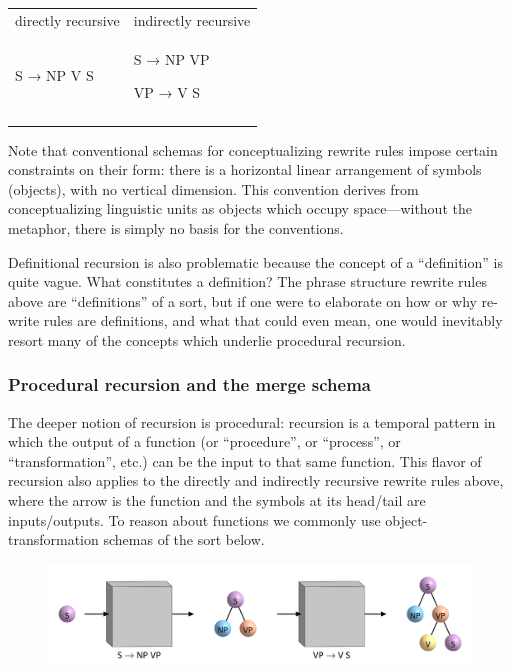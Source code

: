 \begin{tabularx}{\textwidth}{XX}
\lsptoprule
directly recursive & indirectly recursive\\
S → NP V S & S → NP VP

VP →  V S\\
\lspbottomrule
\end{tabularx}
  Note that conventional schemas for conceptualizing rewrite rules impose certain constraints on their form: there is a horizontal linear arrangement of symbols (objects), with no vertical dimension. This convention derives from conceptualizing linguistic units as objects which occupy space—without the metaphor, there is simply no basis for the conventions.

  Definitional recursion is also problematic because the concept of a “definition” is quite vague. What constitutes a definition? The phrase structure rewrite rules above are “definitions” of a sort, but if one were to elaborate on how or why re-write rules are definitions, and what that could even mean, one would inevitably resort many of the concepts which underlie procedural recursion.

\subsubsection{Procedural recursion and the merge schema}

The deeper notion of recursion is procedural: recursion is a temporal pattern in which the output of a function (or “procedure”, or “process”, or “transformation”, etc.) can be the input to that same function. This flavor of recursion also applies to the directly and indirectly recursive rewrite rules above, where the arrow is the function and the symbols at its head/tail are inputs/outputs. To reason about functions we commonly use object-transformation schemas of the sort below.

  
\begin{figure}
\includegraphics[width=\textwidth]{figures/Tilsen-img107.png}
\caption{\missingcaption}
\label{fig:}
\end{figure}
 

